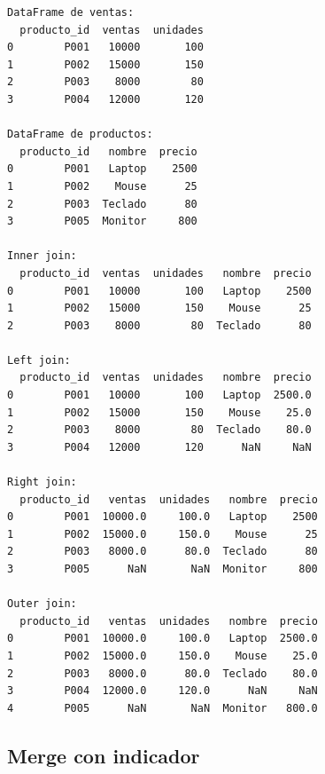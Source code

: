 \documentclass[
  doc,
  floatsintext,
  longtable,
  a4paper,
  nolmodern,
  notxfonts,
  notimes,
  12pt,
  colorlinks=true,linkcolor=blue,citecolor=blue,urlcolor=blue]{apa7}
\begin{document}
\begin{verbatim}
DataFrame de ventas:
  producto_id  ventas  unidades
0        P001   10000       100
1        P002   15000       150
2        P003    8000        80
3        P004   12000       120

DataFrame de productos:
  producto_id   nombre  precio
0        P001   Laptop    2500
1        P002    Mouse      25
2        P003  Teclado      80
3        P005  Monitor     800

Inner join:
  producto_id  ventas  unidades   nombre  precio
0        P001   10000       100   Laptop    2500
1        P002   15000       150    Mouse      25
2        P003    8000        80  Teclado      80

Left join:
  producto_id  ventas  unidades   nombre  precio
0        P001   10000       100   Laptop  2500.0
1        P002   15000       150    Mouse    25.0
2        P003    8000        80  Teclado    80.0
3        P004   12000       120      NaN     NaN

Right join:
  producto_id   ventas  unidades   nombre  precio
0        P001  10000.0     100.0   Laptop    2500
1        P002  15000.0     150.0    Mouse      25
2        P003   8000.0      80.0  Teclado      80
3        P005      NaN       NaN  Monitor     800

Outer join:
  producto_id   ventas  unidades   nombre  precio
0        P001  10000.0     100.0   Laptop  2500.0
1        P002  15000.0     150.0    Mouse    25.0
2        P003   8000.0      80.0  Teclado    80.0
3        P004  12000.0     120.0      NaN     NaN
4        P005      NaN       NaN  Monitor   800.0
\end{verbatim}

\subsection{Merge con indicador}\label{merge-con-indicador}
\end{document}
